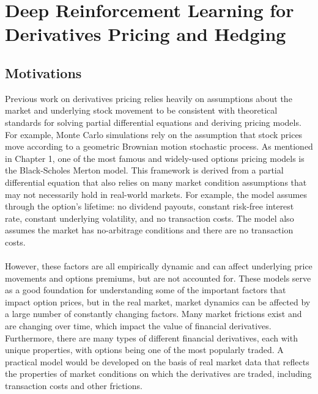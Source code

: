 \chapter{Deep Reinforcement Learning for Derivatives Pricing and Hedging}

\section{Motivations}
Previous work on derivatives pricing relies heavily on assumptions about the market and underlying stock movement to be consistent with theoretical standards for solving partial differential equations and deriving pricing models. For example, Monte Carlo simulations rely on the assumption that stock prices move according to a geometric Brownian motion stochastic process. As mentioned in Chapter 1, one of the most famous and widely-used options pricing models is the Black-Scholes Merton model. This framework is derived from a partial differential equation that also relies on many market condition assumptions that may not necessarily hold in real-world markets. For example, the model assumes through the option’s lifetime: no dividend payouts, constant risk-free interest rate, constant underlying volatility, and no transaction costs. The model also assumes the market has no-arbitrage conditions and there are no transaction costs.
\\ \\
However, these factors are all empirically dynamic and can affect underlying price movements and options premiums, but are not accounted for. These models serve as a good foundation for understanding some of the important factors that impact option prices, but in the real market, market dynamics can be affected by a large number of constantly changing factors. Many market frictions exist and are changing over time, which impact the value of financial derivatives. Furthermore, there are many types of different financial derivatives, each with unique properties, with options being one of the most popularly traded. A practical model would be developed on the basis of real market data that reflects the properties of market conditions on which the derivatives are traded, including transaction costs and other frictions.

